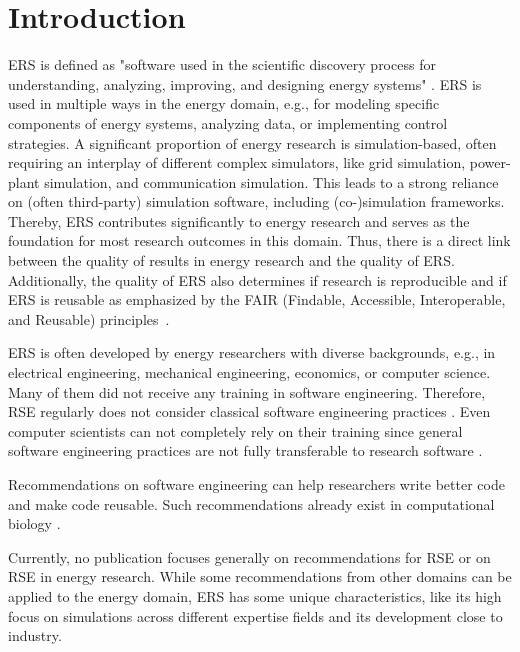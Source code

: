 \section{Introduction}
\label{sec:intro}

\ac{ERS} is defined as "software used in the scientific discovery process for understanding, analyzing, improving, and designing energy systems" \cite{ferenz_towards_2023}.
\ac{ERS} is used in multiple ways in the energy domain, e.g., for modeling specific components of energy systems, analyzing data, or implementing control strategies. A significant proportion of energy research is simulation-based, often requiring an interplay of different complex simulators, like grid simulation, power-plant simulation, and communication simulation. This leads to a strong reliance on (often third-party) simulation software, including (co-)simulation frameworks.
Thereby, \ac{ERS} contributes significantly to energy research and serves as the foundation for most research outcomes in this domain. Thus, there is a direct link between the quality of results in energy research and the quality of \ac{ERS}. Additionally, the quality of \ac{ERS} also determines if research is reproducible and if \ac{ERS} is reusable as emphasized by the FAIR (Findable, Accessible, Interoperable, and Reusable) principles~\cite{barker2022introducing}.

\ac{ERS} is often developed by energy researchers with diverse backgrounds, e.g., in electrical engineering, mechanical engineering, economics, or computer science. Many of them did not receive any training in software engineering. Therefore, \ac{RSE} regularly does not consider classical software engineering practices \cite{hasselbring2020fair}. Even computer scientists can not completely rely on their training since general software engineering practices are not fully transferable to research software \cite{heroux_research_2022}. 

Recommendations on software engineering can help researchers write better code and make code reusable. Such recommendations already exist in  computational biology \cite{list2017ten}.

Currently, no publication focuses generally on recommendations for \ac{RSE} or on \ac{RSE} in energy research. While some recommendations from other domains can be applied to the energy domain, \ac{ERS} has some unique characteristics, like its high focus on simulations across different expertise fields and its development close to industry. 

